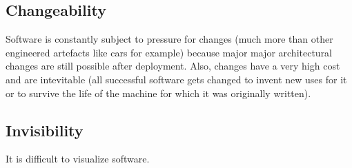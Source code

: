 \documentclass[a4paper,11pt]{report}
\begin{document}
\subsection{Changeability}
Software is constantly subject to pressure for changes (much more than other
engineered artefacts like cars for example) because major major architectural
changes are still possible after deployment. Also, changes have a very high cost
and are intevitable (all successful software gets changed to invent new uses for
it or to survive the life of the machine for which it was originally written).

\subsection{Invisibility}
It is difficult to visualize software.
\end{document}
